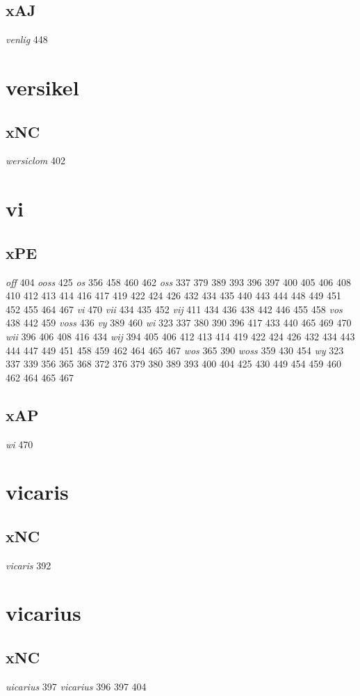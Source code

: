 \documentclass[a4paper,twocolumn]{article}
\begin{document}
\subsection{xAJ}
\label{sec:orgae592f0}
\emph{venlig} 448 
\section{versikel}
\label{sec:orgb1426ea}
\subsection{xNC}
\label{sec:org636f177}
\emph{wersiclom} 402 
\section{vi}
\label{sec:org8091d73}
\subsection{xPE}
\label{sec:org693e7ad}
\emph{off} 404 \emph{ooss} 425 \emph{os} 356 458 460 462 \emph{oss} 337 379 389 393 396 397 400 405 406 408 410 412 413 414 416 417 419 422 424 426 432 434 435 440 443 444 448 449 451 452 455 464 467 \emph{vi} 470 \emph{vii} 434 435 452 \emph{vij} 411 434 436 438 442 446 455 458 \emph{vos} 438 442 459 \emph{voss} 436 \emph{vy} 389 460 \emph{wi} 323 337 380 390 396 417 433 440 465 469 470 \emph{wii} 396 406 408 416 434 \emph{wij} 394 405 406 412 413 414 419 422 424 426 432 434 443 444 447 449 451 458 459 462 464 465 467 \emph{wos} 365 390 \emph{woss} 359 430 454 \emph{wy} 323 337 339 356 365 368 372 376 379 380 389 393 400 404 425 430 449 454 459 460 462 464 465 467 
\subsection{xAP}
\label{sec:orgaf4488e}
\emph{wi} 470 
\section{vicaris}
\label{sec:org500cfaf}
\subsection{xNC}
\label{sec:org080e5a0}
\emph{vicaris} 392 
\section{vicarius}
\label{sec:org978b5b9}
\subsection{xNC}
\label{sec:org2d7e93f}
\emph{uicarius} 397 \emph{vicarius} 396 397 404 
\end{document}
